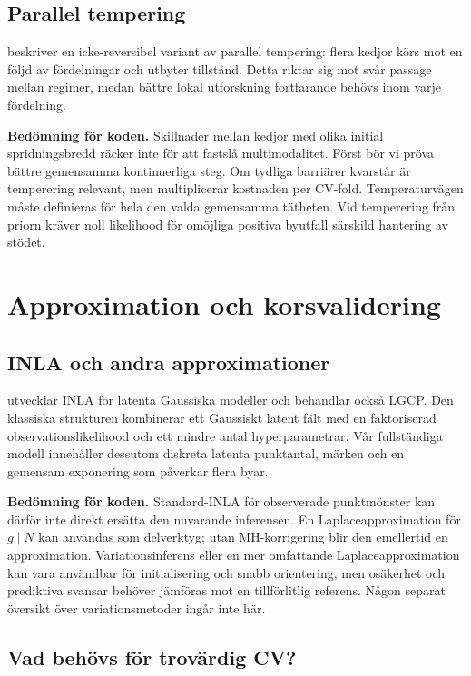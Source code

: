 \documentclass[11pt,a4paper]{article}
\begin{document}
\subsection{Parallel tempering}

\citet{syed2022tempering} beskriver en icke-reversibel variant av parallel tempering: flera kedjor körs mot en följd av fördelningar och utbyter tillstånd. Detta riktar sig mot svår passage mellan regimer, medan bättre lokal utforskning fortfarande behövs inom varje fördelning.

\textbf{Bedömning för koden.} Skillnader mellan kedjor med olika initial spridningsbredd räcker inte för att fastslå multimodalitet. Först bör vi pröva bättre gemensamma kontinuerliga steg. Om tydliga barriärer kvarstår är temperering relevant, men multiplicerar kostnaden per CV-fold. Temperaturvägen måste definieras för hela den valda gemensamma tätheten. Vid temperering från priorn kräver noll likelihood för omöjliga positiva byutfall särskild hantering av stödet.

\section{Approximation och korsvalidering}

\subsection{INLA och andra approximationer}

\citet{rue2009inla} utvecklar INLA för latenta Gaussiska modeller och behandlar också LGCP. Den klassiska strukturen kombinerar ett Gaussiskt latent fält med en faktoriserad observationslikelihood och ett mindre antal hyperparametrar. Vår fullständiga modell innehåller dessutom diskreta latenta punktantal, märken och en gemensam exponering som påverkar flera byar.

\textbf{Bedömning för koden.} Standard-INLA för observerade punktmönster kan därför inte direkt ersätta den nuvarande inferensen. En Laplaceapproximation för $g\mid N$ kan användas som delverktyg; utan MH-korrigering blir den emellertid en approximation. Variationsinferens eller en mer omfattande Laplaceapproximation kan vara användbar för initialisering och snabb orientering, men osäkerhet och prediktiva svansar behöver jämföras mot en tillförlitlig referens. Någon separat översikt över variationsmetoder ingår inte här.

\subsection{Vad behövs för trovärdig CV?}
\end{document}
